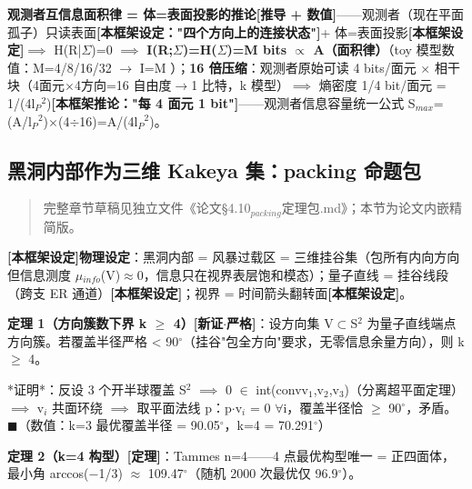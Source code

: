 \documentclass[UTF8,fontset=windows]{csoarticle}
\newcommand{\mtag}[1]{\textbf{[#1]}}
\newcommand{\up}[1]{\ensuremath{^{#1}}}
\newcommand{\down}[1]{\ensuremath{_{#1}}}
\begin{document}
\textbf{观测者互信息面积律 = 体=表面投影的推论}\mtag{推导 + 数值}------观测者（现在平面孤子）只读表面\mtag{本框架设定："四个方向上的连接状态"}+ 体=表面投影\mtag{本框架设定}\ensuremath{\implies} H(R|\ensuremath{\Sigma})=0 \ensuremath{\implies} \textbf{I(R;\ensuremath{\Sigma})=H(\ensuremath{\Sigma})=M bits \ensuremath{\propto} A（面积律）}（toy 模型数值：M=4/8/16/32 \ensuremath{\to} I=M \checkmark）；\textbf{16 倍压缩}：观测者原始可读 4 bits/面元 \ensuremath{\times} 相干块（4面元\ensuremath{\times}4方向=16 自由度\ensuremath{\to}1 比特，k 模型）\ensuremath{\implies} 熵密度 1/4 bit/面元 = 1/(4l\down{P}\up{2})\mtag{本框架推论："每 4 面元 1 bit"}------观测者信息容量统一公式 S\down{max}=(A/l\down{P}\up{2})\ensuremath{\times}(4\ensuremath{\div}16)=A/(4l\down{P}\up{2})。

\subsection{黑洞内部作为三维 Kakeya 集：packing 命题包}

\begin{quote}
完整章节草稿见独立文件《论文\S{}4.10\down{packing}定理包.md》；本节为论文内嵌精简版。
\end{quote}

\textbf{\mtag{本框架设定}物理设定}：黑洞内部 = 风暴过载区 = 三维挂谷集（包所有内向方向但信息测度 \ensuremath{\mu}\down{info}(V)\ensuremath{\approx}0，信息只在视界表层饱和模态）；量子直线 = 挂谷线段（跨支 ER 通道）\mtag{本框架设定}；视界 = 时间箭头翻转面\mtag{本框架设定}。

\textbf{定理 1（方向簇数下界 k \ensuremath{\geq} 4）\mtag{新证\ensuremath{\cdot}严格}}：设方向集 V\ensuremath{\subset}S\up{2} 为量子直线端点方向簇。若覆盖半径严格 < 90\ensuremath{^{\circ}}（挂谷"包全方向"要求，无零信息余量方向），则 k \ensuremath{\geq} 4。

*证明*：反设 3 个开半球覆盖 S\up{2} \ensuremath{\implies} 0 \ensuremath{\in} int(conv{v\down{1},v\down{2},v\down{3}})（分离超平面定理）\ensuremath{\implies} v\down{i} 共面环绕 \ensuremath{\implies} 取平面法线 p：p\ensuremath{\cdot}v\down{i} = 0 \ensuremath{\forall}i，覆盖半径恰 \ensuremath{\geq} 90\ensuremath{^{\circ}}，矛盾。\ensuremath{\blacksquare}（数值：k=3 最优覆盖半径 = 90.05\ensuremath{^{\circ}}，k=4 = 70.291\ensuremath{^{\circ}}）

\textbf{定理 2（k=4 构型）\mtag{定理}}：Tammes n=4------4 点最优构型唯一 = 正四面体，最小角 arccos(\ensuremath{-}1/3) \ensuremath{\approx} 109.47\ensuremath{^{\circ}}（随机 2000 次最优仅 96.9\ensuremath{^{\circ}}）。
\end{document}
